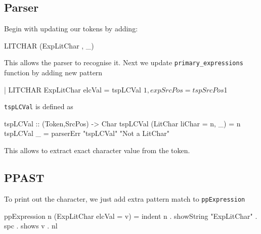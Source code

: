 \documentclass{article}
\begin{document}
\subsection{Parser}
\begin{flushleft}
Begin with updating our tokens by adding:
\end{flushleft}
\begin{code}
LITCHAR     { (ExpLitChar {}, _) }
\end{code}
\begin{flushleft}
This allows the parser to recognise it. Next we update \texttt{primary\_expressions} function by adding new pattern
\end{flushleft}
\begin{code}
| LITCHAR
  { ExpLitChar { elcVal = tspLCVal $1, expSrcPos = tspSrcPos $1 } }
\end{code}
\begin{flushleft}
\texttt{tspLCVal} is defined as
\end{flushleft}
\begin{code}
tspLCVal :: (Token,SrcPos) -> Char
tspLCVal (LitChar {liChar = n}, _) = n
tspLCVal _ = parserErr "tspLCVal" "Not a LitChar"
\end{code}
\begin{flushleft}
This allows to extract exact character value from the token.
\end{flushleft}

\subsection{PPAST}

\begin{flushleft}
To print out the character, we just add extra pattern match to \texttt{ppExpression}
\end{flushleft}
\begin{code}
ppExpression n (ExpLitChar {elcVal = v}) = 
    indent n . showString "ExpLitChar" . spc . shows v . nl
\end{code}
\end{document}

